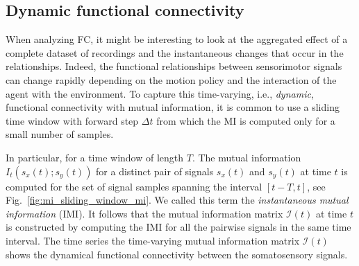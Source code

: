 \subsection{Dynamic functional connectivity}
When analyzing FC, it might be interesting to look at the aggregated effect of a complete dataset of recordings and the instantaneous changes that occur in the relationships. Indeed, the functional relationships between sensorimotor signals can change rapidly depending on the motion policy and the interaction of the agent with the environment. To capture this time-varying, i.e., \emph{dynamic}, functional connectivity with mutual information, it is common to use a sliding time window \cite{Preti2017dynamicfunctionalconnectome} with forward step $\Delta t$ from which the MI is computed only for a small number of samples.

In particular, for a time window of length $T$. The mutual information $I_t(s_x(t);s_y(t))$ for a distinct pair of signals $s_x(t)$ and $s_y(t)$ at time $t$ is computed for the set of signal samples spanning the interval $\left[t-T,t\right]$, see Fig.~\ref{fig:mi_sliding_window_mi}. We called this term the \emph{instantaneous mutual information} (IMI). It follows that the mutual information matrix $\bm{\mathcal{I}}(t)$ at time $t$ is constructed by computing the IMI for all the pairwise signals in the same time interval. The time series the time-varying mutual information matrix $\bm{\mathcal{I}}(t)$ shows the dynamical functional connectivity between the somatosensory signals.


